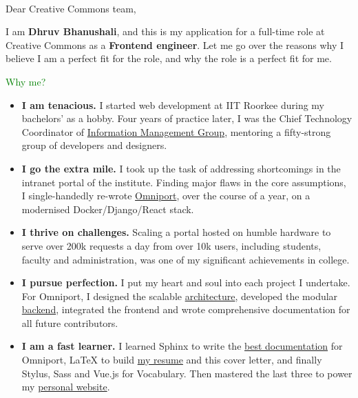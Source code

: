 \begin{multicols}{2}[]
  
  \columnbreak  
  \\
\end{multicols}

\setlength{\parskip}{\baselineskip} %
\vspace{-0.5cm}
Dear Creative Commons team,

I am \textbf{Dhruv Bhanushali}, and this is my application for a full-time role
at Creative Commons as a \textbf{Frontend engineer}. Let me go over the reasons
why I believe I am a perfect fit for the role, and why the role is a perfect fit
for me.

\textcolor{green}{Why me?}
\begin{itemize}[nosep, parsep=1mm, leftmargin=*]
  \item \textbf{I am tenacious.} I started web development at IIT Roorkee during
  my bachelors' as a hobby. Four years of practice later, I was the Chief
  Technology Coordinator of
  \href{https://https://internet.channeli.in/maintainer_site/}{Information
  Management Group}, mentoring a fifty-strong group of developers and designers.

  \item \textbf{I go the extra mile.} I took up the task of addressing
  shortcomings in the intranet portal of the institute. Finding major flaws in
  the core assumptions, I single-handedly re-wrote
  \href{https://omniport.readthedocs.io}{Omniport}, over the course of a year,
  on a modernised Docker/Django/React stack.

  \item \textbf{I thrive on challenges.} Scaling a portal hosted on humble
  hardware to serve over 200k requests a day from over 10k users, including
  students, faculty and administration, was one of my significant achievements
  in college.

  \item \textbf{I pursue perfection.} I put my heart and soul into each project
  I undertake. For Omniport, I designed the scalable
  \href{https://github.com/IMGIITRoorkee/omniport-docker/}{architecture},
  developed the modular
  \href{https://github.com/IMGIITRoorkee/omniport-backend/}{backend}, integrated
  the frontend and wrote comprehensive documentation for all future
  contributors.

  \item \textbf{I am a fast learner.} I learned Sphinx to write the
  \href{https://github.com/IMGIITRoorkee/omniport-docs/}{best documentation} for
  Omniport, {\selectfont\LaTeX} to build
  \href{https://github.com/dhruvkb/resume/}{my resume} and this cover letter,
  and finally Stylus, Sass and Vue.js for Vocabulary. Then mastered the last
  three to power my \href{https://dhruvkb.github.io/}{personal website}.


\end{itemize}
